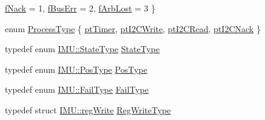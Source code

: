 \begin{DoxyCompactItemize}
\hyperlink{class_i_m_u_a4edeb07a848734657792b4ef8749fb97a17dff6c1392332855f9e83033dff49f8}{fNack} =  1, 
\hyperlink{class_i_m_u_a4edeb07a848734657792b4ef8749fb97a4f33b2c6a17b90c350b4ad6f5f71cc34}{fBusErr} =  2, 
\hyperlink{class_i_m_u_a4edeb07a848734657792b4ef8749fb97acf94640c5a7cfb3a4fc806dabf005260}{fArbLost} =  3
 \}
\item 
enum \hyperlink{class_i_m_u_a5a642d4cba90a478ae8c3312a47a57ce}{ProcessType} \{ \hyperlink{class_i_m_u_a5a642d4cba90a478ae8c3312a47a57cea978a6a5569595a7e86fe7e48d2684a7f}{ptTimer}, 
\hyperlink{class_i_m_u_a5a642d4cba90a478ae8c3312a47a57cea32f99524523d0d11cbd3348ee2fba9ea}{ptI2CWrite}, 
\hyperlink{class_i_m_u_a5a642d4cba90a478ae8c3312a47a57cea5aabc602033dc4f845e45d33fe939688}{ptI2CRead}, 
\hyperlink{class_i_m_u_a5a642d4cba90a478ae8c3312a47a57ceab11e066033d0049893742894a7252fc8}{ptI2CNack}
 \}
\item 
typedef enum \hyperlink{class_i_m_u_a7b5e1bf1cf1407b3e4cf0dd2e18b523f}{IMU::StateType} \hyperlink{class_i_m_u_a2c1f560a0bc80d0bd06bb56a614aeedd}{StateType}
\item 
typedef enum \hyperlink{class_i_m_u_ad01128d82debc1e4213affe4858f3144}{IMU::PosType} \hyperlink{class_i_m_u_ad82ee88c050235081f004f81a5724e09}{PosType}
\item 
typedef enum \hyperlink{class_i_m_u_a4edeb07a848734657792b4ef8749fb97}{IMU::FailType} \hyperlink{class_i_m_u_a4baf4d6e504dcb71c4afab34be225620}{FailType}
\item 
typedef struct \hyperlink{struct_i_m_u_1_1reg_write}{IMU::regWrite} \hyperlink{class_i_m_u_a1960eeaec92b6b60d4f6c9e28b042b80}{RegWriteType}
\end{DoxyCompactItemize}
